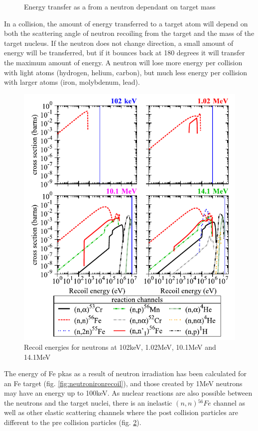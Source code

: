\begin{figure}
\begin{minipage}{.46\textwidth}
\caption{Energy transfer as a from a neutron dependant on target mass}
\label{fig:energytransfer}
\end{minipage}
\end{figure}

In a collision, the amount of energy transferred to a target atom will depend on both the scattering angle of neutron recoiling from the target and the mass of the target nucleus.  If the neutron does not change direction, a small amount of energy will be transferred, but if it bounces back at 180 degrees it will transfer the maximum amount of energy.  A neutron will lose more energy per collision with light atoms (hydrogen, helium, carbon), but much less energy per collision with larger atoms (iron, molybdenum, lead).

\begin{figure}[h]
  \begin{center}
    \includegraphics[width=.65\linewidth]{chapters/austenitic_steels_in_nuclear/images/neutronrecoils.png}
    \caption{Recoil energies for neutrons at 102keV, 1.02MeV, 10.1MeV and 14.1MeV\cite{pkaenergyspectra}}
    \label{fig:ferecoilchannels}
  \end{center}
\end{figure}
\FloatBarrier


The energy of Fe \acrshort{pka}s as a result of neutron irradiation has been calculated for an Fe target\cite{pkaenergyspectra} (fig. \ref{fig:neutronironrecoil}), and those created by 1MeV neutrons may have an energy up to 100keV.  As nuclear reactions are also possible between the neutrons and the target nuclei, there is an inelastic $(n,n) {}^{56}Fe$ channel as well as other elastic scattering channels where the post collision particles are different to the pre collision particles (fig. \ref{fig:ferecoilchannels}).






